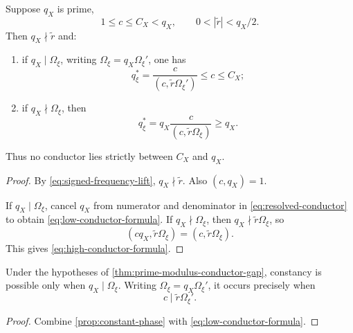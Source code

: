 \begin{theorem}
\label{thm:prime-modulus-conductor-gap}
Suppose \(q_X\) is prime,
\[
 1\le c\le C_X<q_X,
 \qquad
 0<|\widetilde r|<q_X/2.
\]
Then \(q_X\nmid\widetilde r\) and:
\begin{enumerate}[label=(\roman*),leftmargin=2.2em]
\item if \(q_X\mid\Omega_\xi\), writing
  \(\Omega_\xi=q_X\Omega_\xi'\), one has
  \begin{equation}
   q_\xi^\ast
   =
   \frac{c}{(c,\widetilde r\Omega_\xi')}
   \le c\le C_X;
  \label{eq:low-conductor-formula}
  \end{equation}
\item if \(q_X\nmid\Omega_\xi\), then
  \begin{equation}
   q_\xi^\ast
   =
   q_X\frac{c}{(c,\widetilde r\Omega_\xi)}
   \ge q_X.
  \label{eq:high-conductor-formula}
  \end{equation}
\end{enumerate}
Thus no conductor lies strictly between \(C_X\) and \(q_X\).
\end{theorem}

\begin{proof}
By \eqref{eq:signed-frequency-lift},
\(q_X\nmid\widetilde r\).  Also \((c,q_X)=1\).

If \(q_X\mid\Omega_\xi\), cancel \(q_X\) from numerator and
denominator in \eqref{eq:resolved-conductor} to obtain
\eqref{eq:low-conductor-formula}.  If
\(q_X\nmid\Omega_\xi\), then
\(q_X\nmid\widetilde r\Omega_\xi\), so
\[
 (cq_X,\widetilde r\Omega_\xi)
 =
 (c,\widetilde r\Omega_\xi).
\]
This gives \eqref{eq:high-conductor-formula}.
\end{proof}

\begin{corollary}
\label{cor:explicit-constant-branch}
Under the hypotheses of
\cref{thm:prime-modulus-conductor-gap}, constancy is possible only
when \(q_X\mid\Omega_\xi\).  Writing
\(\Omega_\xi=q_X\Omega_\xi'\), it occurs precisely when
\begin{equation}
 c\mid \widetilde r\Omega_\xi'.
\label{eq:constant-divisibility}
\end{equation}
\end{corollary}

\begin{proof}
Combine \cref{prop:constant-phase} with
\eqref{eq:low-conductor-formula}.
\end{proof}

